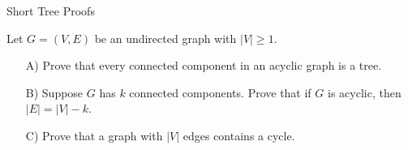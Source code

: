 \begin{homeworkProblem}{Short Tree Proofs}

    Let $G=(V,E)$ be an undirected graph with $|V| \geq 1$.

    \begin{itemize}
        \item[A)] Prove that every connected component in an acyclic graph is a tree.
        \item[B)] Suppose $G$ has $k$ connected components. Prove that if $G$ is acyclic, then $|E|=|V|-k$.
        \item[C)] Prove that a graph with $|V|$ edges contains a cycle. 
    \end{itemize}
    
\end{homeworkProblem}